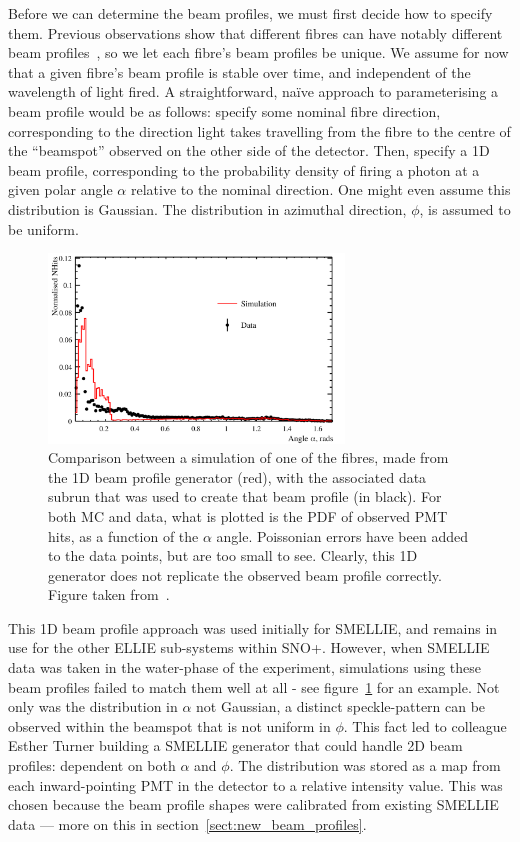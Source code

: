 Before we can determine the beam profiles, we must first decide how to specify them. Previous observations show that different fibres can have notably different beam profiles~\cite{majumdar_measurement_2015}, so we let each fibre's beam profiles be unique. We assume for now that a given fibre's beam profile is stable over time, and independent of the wavelength of light fired. A straightforward, na\"{i}ve approach to parameterising a beam profile would be as follows: specify some nominal fibre direction, corresponding to the direction light takes travelling from the fibre to the centre of the ``beamspot'' observed on the other side of the detector. Then, specify a 1D beam profile, corresponding to the probability density of firing a photon at a given polar angle $\alpha$ relative to the nominal direction. One might even assume this distribution is Gaussian. The distribution in azimuthal direction, $\phi$, is assumed to be uniform.

\begin{figure}
    \centering
    \includegraphics[width=0.7\textwidth]{5_SMELLIESimulation/images/1D_gen_plot.png}
    \caption{Comparison between a simulation of one of the fibres, made from the 1D beam profile generator (red), with the associated data subrun that was used to create that beam profile (in black). For both MC and data, what is plotted is the PDF of observed PMT hits, as a function of the $\alpha$ angle. Poissonian errors have been added to the data points, but are too small to see. Clearly, this 1D generator does not replicate the observed beam profile correctly. Figure taken from~\cite{turner_measurement_2022}.}
    \label{fig:1d_gen_plot}
\end{figure}

This 1D beam profile approach was used initially for SMELLIE, and remains in use for the other ELLIE sub-systems within SNO+. However, when SMELLIE data was taken in the water-phase of the experiment, simulations using these beam profiles failed to match them well at all - see figure~\ref{fig:1d_gen_plot} for an example. Not only was the distribution in $\alpha$ not Gaussian, a distinct speckle-pattern can be observed within the beamspot that is not uniform in $\phi$. This fact led to colleague Esther Turner building a SMELLIE generator that could handle 2D beam profiles: dependent on both $\alpha$ and $\phi$. The distribution was stored as a map from each inward-pointing PMT in the detector to a relative intensity value. This was chosen because the beam profile shapes were calibrated from existing SMELLIE data --- more on this in section~\ref{sect:new_beam_profiles}.

